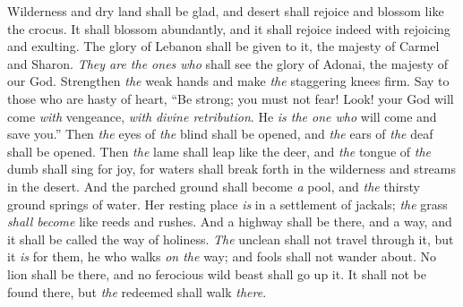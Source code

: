 \begin{biblechapter} %
 Wilderness and dry land shall be glad, 
and desert shall rejoice and blossom like the crocus.
\verse It shall blossom abundantly, 
and it shall rejoice indeed with rejoicing and exulting. 
The glory of Lebanon shall be given to it, 
the majesty of Carmel and Sharon. 
\textit{They are the ones who} shall see the glory of Adonai, 
the majesty of our God.
\verse Strengthen \textit{the} weak hands 
and make \textit{the} staggering knees firm.
\verse Say to those who are hasty of heart,
\verse “Be strong; you must not fear! 
Look! your God will come \textit{with} vengeance, 
\textit{with} \textit{divine retribution}. 
He \textit{is the one who} will come and save you.”
\verse Then \textit{the} eyes of \textit{the} blind shall be opened, 
and \textit{the} ears of \textit{the} deaf shall be opened.
\verse Then \textit{the} lame shall leap like the deer, 
and \textit{the} tongue of \textit{the} dumb shall sing for joy, 
for waters shall break forth in the wilderness 
and streams in the desert.
\verse And the parched ground shall become \textit{a} pool, 
and \textit{the} thirsty ground springs of water. 
Her resting place \textit{is} in a settlement of jackals; 
\textit{the} grass \textit{shall become} like reeds and rushes.
\verse And a highway shall be there, and a way, 
and it shall be called the way of holiness. 
\textit{The} unclean shall not travel through it, 
but it \textit{is} for them, he who walks \textit{on the} way; 
and fools shall not wander about.
\verse No lion shall be there, 
and no ferocious wild beast shall go up it. 
It shall not be found there, 
but \textit{the} redeemed shall walk \textit{there}.
\end{biblechapter}

